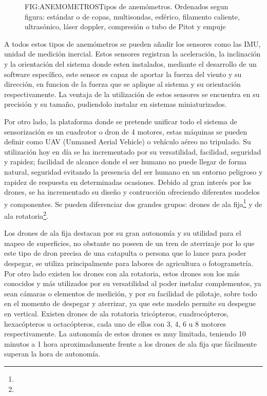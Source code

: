 \begin{figure}[Tipos de anemómetros]{FIG:ANEMOMETROS}{Tipos de anemómetros. Ordenados segun figura: estándar o de copas, multisondas, esférico, filamento caliente, ultrasónico, láser doppler, compresión o tubo de Pitot y empuje}
\end{figure}

A todos estos tipos de anemómetros se pueden añadir los sensores como las IMU, unidad de medición inercial. Estos sensores registran la aceleración, la inclinación y la orientación del sistema donde esten instalados, mediante el desarrollo de un software específico, este sensor es capaz de aportar la fuerza del viento y su dirección, en funcion de la fuerza que se aplique al sistema y su orientación respectivamente. La ventaja de la utilización de estos sensores se encuentra en su precisión y su tamaño, pudiendolo instalar en sistemas miniaturizados.

Por otro lado, la plataforma donde se pretende unificar todo el sistema de sensorización es un cuadrotor o dron de 4 motores, estas máquinas se pueden definir como UAV (Unmaned Aerial Vehicle) o vehículo aéreo no tripulado. Su utilización hoy en día se ha incrementado por su versatilidad, facilidad, seguridad y rapidez; facilidad de alcance donde el ser humano no puede llegar de forma natural, seguridad evitando la presencia del ser humano en un entorno peligroso y rapidez de respuesta en determinadas ocasiones. Debido al gran interés por los drones\cite{hiltner2013drones}, se ha incrementado su diseño y contrucción ofreciendo diferentes modelos y componentes. Se pueden diferenciar dos grandes grupos: drones de ala fija\footnote{} y de ala rotatoria\footnote{}. 

Los drones de ala fija destacan por su gran autonomía y su utilidad para el mapeo de superficies, no obstante no poseen de un tren de aterrizaje por lo que este tipo de dron precisa de una catapulta o persona que lo lance para poder despegar, se utiliza principalmente para labores de agricultura o fotogrametría\cite{Pozuelo2003}. Por otro lado existen los drones con ala rotatoria, estos drones son los más conocidos y más utilizados por su versatilidad al poder instalar complementos, ya sean cámaras o elementos de medición, y por su facilidad de pilotaje, sobre todo en el momento de despegar y aterrizar, ya que este modelo permite su despegue en vertical. Existen drones de ala rotatoria tricópteros, cuadrocópteros, hexacópteros u octacópteros, cada uno de ellos con 3, 4, 6 u 8 motores respectivamente. La autonomía de estos drones es muy limitada, teniendo 10 minutos a 1 hora aproximadamente frente a los drones de ala fija que fácilmente superan la hora de autonomía.

